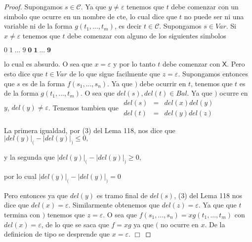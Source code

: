   \begin{proof}
    Supongamos \(s\in \mathcal{C}\). Ya que \(y\neq \varepsilon \) tenemos que \(t\) debe comenzar con un simbolo que ocurre en un nombre de cte, lo cual dice que \(t\) no puede ser ni una variable ni de la forma \(g(t_{1},...,t_{m})\), es decir \(t\in \mathcal{C}\). Supongamos \(s\in Var\). Si \(x\neq \varepsilon \) tenemos que \(t\) debe comenzar con alguno de los siguientes simbolos

    \(\displaystyle \mathit{0}\;\mathit{1\;}...\;\mathit{9}\;\mathbf{0}\;\mathbf{1}\ ...\; \mathbf{9} \)

    lo cual es absurdo. O sea que \(x=\varepsilon \) y por lo tanto \(t\) debe comenzar con \(\mathsf{X}\). Pero esto dice que \(t\in Var\) de lo que sigue facilmente que \(z=\varepsilon \). Supongamos entonces que \(s\) es de la forma \( f(s_{1},...,s_{n})\). Ya que \()\) debe ocurrir en \(t\), tenemos que \(t\) es de la forma \(g(t_{1},...,t_{m})\). O sea que \(del(s),del(t)\in Bal\). Ya que \()\) ocurre en \(y\), \(del(y)\neq \varepsilon \). Tenemos tambien que
    \(\displaystyle \begin{array}{rcl} del(s) & =& del(x)del(y) \\ del(t) & =& del(y)del(z) \end{array} \)

    La primera igualdad, por (3) del Lema 118, nos dice que
    \(\displaystyle \left\vert del(y)\right\vert _{(}-\left\vert del(y)\right\vert _{)}\leq 0, \)

    y la segunda que
    \(\displaystyle \left\vert del(y)\right\vert _{(}-\left\vert del(y)\right\vert _{)}\geq 0, \)

    por lo cual
    \(\displaystyle \left\vert del(y)\right\vert _{(}-\left\vert del(y)\right\vert _{)}=0 \)

    Pero entonces ya que \(del(y)\) es tramo final de \(del(s)\), (3) del Lema 118 nos dice que \(del(x)=\varepsilon \). Similarmente obtenemos que \(del(z)=\varepsilon \). Ya que que \(t\) termina con \()\) tenemos que \(z=\varepsilon \). O sea que \(f(s_{1},...,s_{n})=xg(t_{1},...,t_{m})\) con \(del(x)=\varepsilon \), de lo que se saca que \(f=xg\) ya que \((\) no ocurre en \( x\). De la definicion de tipo se desprende que \(x=\varepsilon \). \(\Box\)
  \end{proof}

